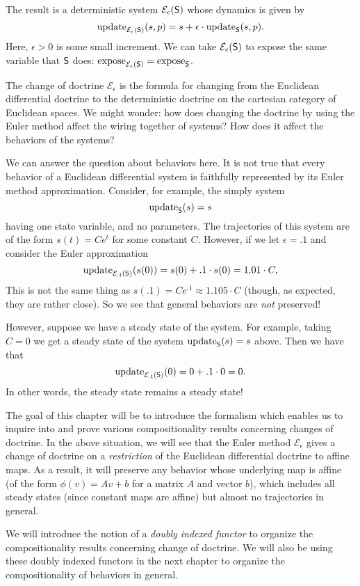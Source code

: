\documentclass[DynamicalBook]{subfiles}
\begin{document}
The result is a deterministic system $\mathcal{E}_{\epsilon}(\mathsf{S})$ whose
dynamics is given by
\[
\mathrm{update}_{\mathsf{\mathcal{E}_{\epsilon}(\mathsf{S})}}(s, p) = s + \epsilon \cdot
\mathrm{update}_{\mathsf{S}}(s, p).
\]
Here, $\epsilon > 0$ is some small increment. We can take $\mathcal{E}_{\epsilon}(\mathsf{S})$ to expose the same variable that
$\mathsf{S}$ does: $\mathrm{expose}_{\mathsf{\mathcal{E}_{\epsilon}(\mathsf{S})}} = \mathrm{expose}_{\mathsf{S}}$.

The change of doctrine $\mathcal{E}_{\epsilon}$ is the formula for changing from
the Euclidean differential doctrine to the deterministic doctrine on the
cartesian category of Euclidean spaces. We might wonder: how does changing the
doctrine by using the Euler method affect the wiring together of systems? How
does it affect the behaviors of the systems?

We can answer the question about behaviors here. It is not true that every
behavior of a Euclidean differential system is faithfully represented by its
Euler method approximation. Consider, for example, the simply system
\[
\mathrm{update}_{\mathsf{S}}(s) = s
\]
having one state variable, and no parameters. The trajectories of this system
are of the form $s(t) = Ce^t$ for some constant $C$. However, if we let
$\epsilon = .1$ and consider the Euler approximation
\[
\mathrm{update}_{\mathsf{\mathcal{E}_{.1}(\mathsf{S})}}(s(0)) = s(0) + .1 \cdot s(0) = 1.01
\cdot C,
\]
This is not the same thing as $s(.1) = Ce^{.1} \approx 1.105 \cdot C$ (though,
as expected, they are rather close). So we see that general behaviors are
\emph{not} preserved!

However, suppose we have a steady state of the system. For example, taking $C =
0$ we get a steady state of the system $\mathrm{update}_{\mathsf{S}}(s) = s$ above. Then we have
that
\[
\mathrm{update}_{\mathsf{\mathcal{E}_{.1}(\mathsf{S})}}(0) = 0 + .1 \cdot 0 = 0.
\]
In other words, the steady state remains a steady state!

The goal of this chapter will be to introduce the formalism which enables us to
inquire into and prove various compositionality results concerning changes of
doctrine. In the above situation, we will see that the Euler method
$\mathcal{E}_{\epsilon}$ gives a change of doctrine on a \emph{restriction} of
the Euclidean differential doctrine to affine maps. As a result, it will
preserve any behavior whose underlying map is affine (of the form $\phi(v) = Av
+ b$ for a matrix $A$ and vector $b$), which includes all steady states (since
constant maps are affine) but almost no trajectories in general. 

We will introduce the notion of a \emph{doubly indexed functor} to organize the
compositionality results concerning change of doctrine. We will also be using
these doubly indexed functors in the next chapter to organize the
compositionality of behaviors in general.
\end{document}
